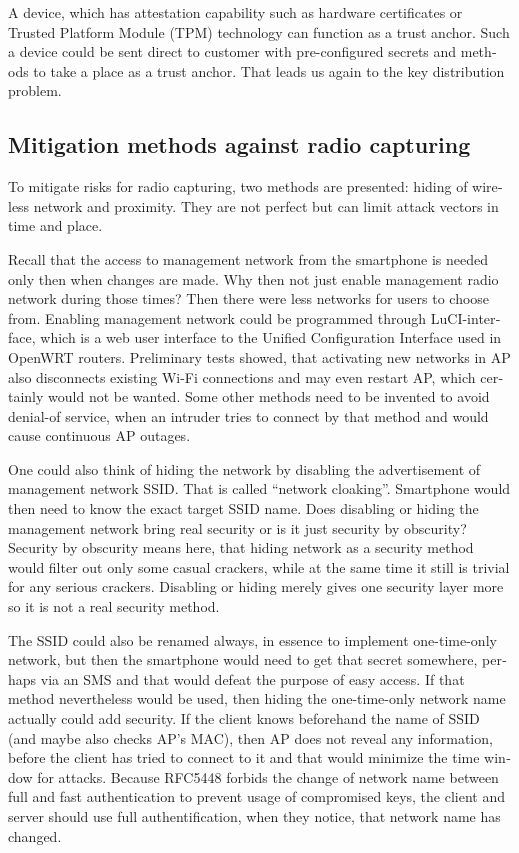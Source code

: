 \documentclass[12pt,a4paper,english]{tutthesis}
\begin{document}
\begin{otherlanguage}{english}
A device, which has attestation capability such as 
hardware certificates or Trusted Platform Module (TPM) technology
can function as a trust anchor.
Such a device could be sent direct to customer with pre-configured
secrets and methods to take a place as a trust anchor. 
That leads us again to the key distribution problem.


\subsection{Mitigation methods against radio capturing}
\label{sec-6-1-7}
To mitigate risks for radio capturing, two methods are presented: hiding of
wireless network and proximity. They are not perfect but can
limit attack vectors in time and place.


Recall that the access to management network from the smartphone is
 needed only then when changes
are made. Why then not just enable management radio network
during those times? Then there were less networks for users to choose from.
Enabling management network could be programmed through 
LuCI-interface, which is a web user interface to the Unified
 Configuration Interface used in OpenWRT routers.
Preliminary tests showed, that activating new networks in AP also 
disconnects existing Wi-Fi connections and may even restart AP,
which certainly would not be wanted. Some other methods need to
be invented to avoid denial-of service, when an intruder tries to 
connect by that method and would cause continuous AP outages.

\label{tag:hidessid}
One could also think of hiding the network by disabling the
advertisement of manage\-ment network SSID. That is called ``network
cloaking''.  Smartphone would then need to know the exact target SSID name.
Does disabling or hiding the management network bring real security or
is it just security by obscurity?  Security by obscurity means here,
that hiding network 
as a security method would filter out only some casual crackers, while
at the same time it still is trivial for any serious crackers.
Disabling or hiding  merely gives one security layer more so it is not
a real security method.

The SSID could also be renamed always, in essence to implement
one-time-only network, but then the smartphone would need to get that
secret somewhere, perhaps via an SMS and that would defeat the purpose
of easy access.  If that method nevertheless would be used, then
hiding the one-time-only network name actually could add security. 
If the client knows beforehand the name of SSID
(and maybe also checks AP's MAC), then AP does not reveal any information,
before the client has tried to connect to it and that would minimize
the time window for attacks. 
Because RFC5448\cite[p.12]{rfc5448} forbids the change of network name between full and
fast authentication to prevent usage of compromised keys, the client
and server should use full authentification, when they notice, that
network name has changed.





\end{otherlanguage}
\end{document}
